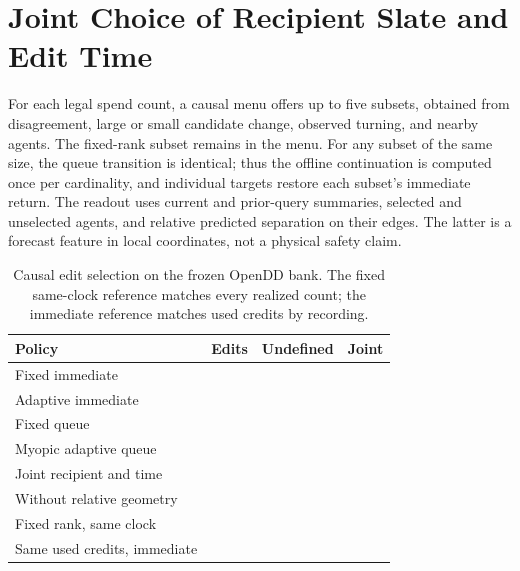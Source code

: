 \section{Joint Choice of Recipient Slate and Edit Time}

For each legal spend count, a causal menu offers up to
five subsets, obtained from disagreement, large or small
candidate change, observed turning, and nearby agents.
The fixed-rank subset remains in the menu. For any subset
of the same size, the queue transition is identical; thus
the offline continuation is computed once per cardinality,
and individual targets restore each subset's immediate
return. The readout uses current and prior-query summaries,
selected and unselected agents, and relative predicted
separation on their edges. The latter is a forecast feature
in local coordinates, not a physical safety claim.

\begin{table}[h]
\centering
\caption{Causal edit selection on the frozen OpenDD bank.
The fixed same-clock reference matches every realized count;
the immediate reference matches used credits by recording.}
\small
\begin{tabular}{lrrr}
\toprule
Policy & Edits & Undefined & Joint \\
\midrule
Fixed immediate & \SlateQueueFixedNowEdits{} & \SlateQueueFixedNowUndefined{} & \SlateQueueFixedNowPass{} \\
Adaptive immediate & \SlateQueueAdaptiveNowEdits{} & \SlateQueueAdaptiveNowUndefined{} & \SlateQueueAdaptiveNowPass{} \\
Fixed queue & \SlateQueueFixedEdits{} & \SlateQueueFixedUndefined{} & \SlateQueueFixedPass{} \\
Myopic adaptive queue & \SlateQueueCurrentEdits{} & \SlateQueueCurrentUndefined{} & \SlateQueueCurrentPass{} \\
Joint recipient and time & \SlateQueueJointEdits{} & \SlateQueueJointUndefined{} & \SlateQueueJointPass{} \\
Without relative geometry & \SlateQueueNoGeomEdits{} & \SlateQueueNoGeomUndefined{} & \SlateQueueNoGeomPass{} \\
Fixed rank, same clock & \SlateQueueClockEdits{} & \SlateQueueClockUndefined{} & \SlateQueueClockPass{} \\
Same used credits, immediate & \SlateQueueCreditsEdits{} & \SlateQueueCreditsUndefined{} & \SlateQueueCreditsPass{} \\
\bottomrule
\end{tabular}
\end{table}

